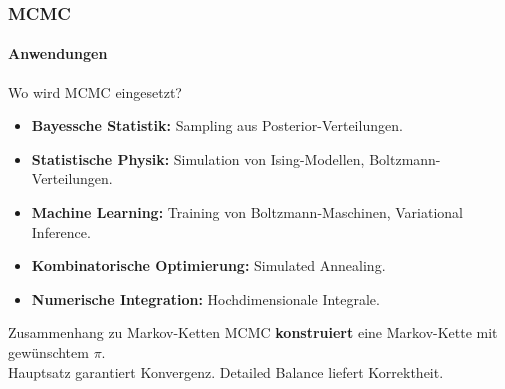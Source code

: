 \documentclass{beamer}
\begin{document}

\begin{frame}
    \frametitle{MCMC}
\framesubtitle{Anwendungen}
    \begin{block}{Wo wird MCMC eingesetzt?}
\begin{itemize}
\item \textbf{Bayessche Statistik:} Sampling aus Posterior-Verteilungen.
\item \textbf{Statistische Physik:} Simulation von Ising-Modellen, Boltzmann-Verteilungen.
\item \textbf{Machine Learning:} Training von Boltzmann-Maschinen, Variational Inference.
\item \textbf{Kombinatorische Optimierung:} Simulated Annealing.
\item \textbf{Numerische Integration:} Hochdimensionale Integrale.
\end{itemize}
\end{block}
\begin{block}{Zusammenhang zu Markov-Ketten}
MCMC \textbf{konstruiert} eine Markov-Kette mit gewünschtem $\pi$.\\
Hauptsatz garantiert Konvergenz. Detailed Balance liefert Korrektheit.
\end{block}
 \end{frame}
\end{document}

